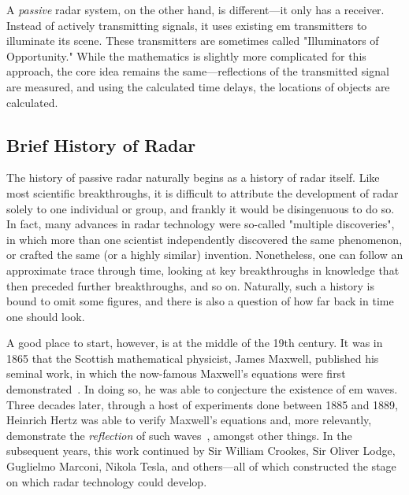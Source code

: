 \documentclass[class=report,11pt,crop=false]{standalone}
\begin{document}
A \emph{passive} radar system, on the other hand, is different---it only has a receiver. Instead of actively transmitting signals, it uses existing \gls{em} transmitters to illuminate its scene. These transmitters are sometimes called "Illuminators of Opportunity." While the mathematics is slightly more complicated for this approach, the core idea remains the same---reflections of the transmitted signal are measured, and using the calculated time delays, the locations of objects are calculated.

\subsection{Brief History of Radar}
The history of passive radar naturally begins as a history of radar itself. Like most scientific breakthroughs, it is difficult to attribute the development of radar solely to one individual or group, and frankly it would be disingenuous to do so. In fact, many advances in radar technology were so-called "multiple discoveries", in which more than one scientist independently discovered the same phenomenon, or crafted the same (or a highly similar) invention. Nonetheless, one can follow an approximate trace through time, looking at key breakthroughs in knowledge that then preceded further breakthroughs, and so on. Naturally, such a history is bound to omit some figures, and there is also a question of how far back in time one should look.

A good place to start, however, is at the middle of the 19th century. It was in 1865 that the Scottish mathematical physicist, James Maxwell, published his seminal work, in which the now-famous Maxwell's equations were first demonstrated~\cite{maxwell1865viii}. In doing so, he was able to conjecture the existence of \gls{em} waves. Three decades later, through a host of experiments done between 1885 and 1889, Heinrich Hertz was able to verify Maxwell's equations and, more relevantly, demonstrate the \emph{reflection} of such waves~\cite{hertz1893electromagnetic, Cichon1995}, amongst other things. In the subsequent years, this work continued by Sir William Crookes, Sir Oliver Lodge, Guglielmo Marconi, Nikola Tesla, and others---all of which constructed the stage on which radar technology could develop.
\end{document}
